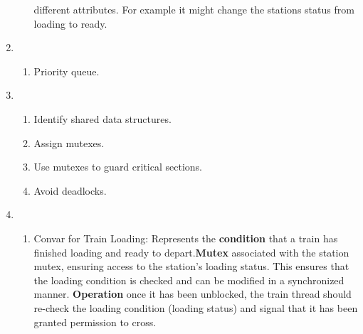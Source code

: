\documentclass[10pt]{article}
\begin{document}
\begin{enumerate}
\begin{enumerate}
                different attributes. For example it might change the stations
                status from loading to ready.
        \end{enumerate}
    \item 
        \begin{enumerate}
            \item Priority queue.
        \end{enumerate}
    \item 
        \begin{enumerate}
            \item Identify shared data structures.
            \item Assign mutexes.
            \item Use mutexes to guard critical sections.
            \item Avoid deadlocks.
        \end{enumerate}
    \item 
        \begin{enumerate}
            \item Convar for Train Loading:
                Represents the \textbf{condition} that a train has finished loading and
                ready to depart.\textbf{Mutex} associated with the station mutex,
                ensuring access to the station's loading status. This ensures that 
                the loading condition is checked and can be modified in a 
                synchronized manner. \textbf{Operation} once it
                has been unblocked, the train thread should re-check the 
                loading condition (loading status) and signal that it has been
                granted permission to cross.


\end{enumerate}
\end{enumerate}
\end{document}

